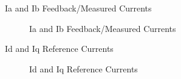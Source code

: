 \begin{frame}{Ia and Ib Feedback/Measured Currents}
	\begin{figure}
		\centering

		\caption{Ia and Ib Feedback/Measured Currents}
	\end{figure}
\end{frame}

\begin{frame}{Id and Iq Reference Currents}
	\begin{figure}
		\centering


		\caption{Id and Iq Reference Currents}
	\end{figure}
\end{frame}

